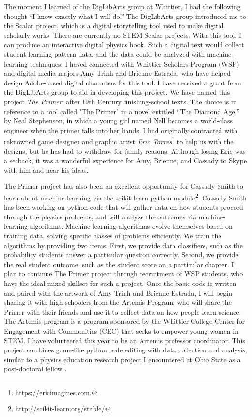 \documentclass[../../main.tex]{subfiles}
\begin{document}
The moment I learned of the DigLibArts group at Whittier, I had the following thought ``I know exactly what I will do.''  The DigLibArts group introduced me to the Scalar project, which is a digital storytelling tool used to make digital scholarly works.  There are currently no STEM Scalar projects.  With this tool, I can produce an interactive digital physics book.  Such a digital text would collect student learning pattern data, and the data could be analyzed with machine-learning techniques.  I haved connected with Whittier Scholars Program (WSP) and digital media majors Amy Trinh and Brienne Estrada, who have helped design Adobe-based digital characters for this tool.  I have received a grant from the DigLibArts group to aid in developing this project.  We have named this project \textit{The Primer}, after 19th Century finishing-school texts.  The choice is in reference to a tool called "The Primer" in a novel entitled ``The Diamond Age,'' by Neal Stephenson, in which a young girl named Nell becomes a world-class engineer when the primer falls into her hands.  I had originally contracted with reknowned game designer and graphic artist \textit{Eric Torres}\footnote{\url{https://ericimagines.com.}} to help us with the designs, but he has had to withdraw for family reasons.  Although losing Eric was a setback, it was a wonderful experience for Amy, Brienne, and Cassady to Skype with him and hear his ideas. \\ \hspace{0.1cm}

The Primer project has also been an excellent opportunity for Cassady Smith to learn about machine learning via the scikit-learn python module\footnote{http://scikit-learn.org/stable/}.  Cassady Smith has been working on python code that will gather data on how students proceed through the physics problems, and will analyze the outcomes via machine-learning algorithms.  Machine-learning algorithms evolve themselves based on training data, solving specific classes of problems efficiently.  We train the algorithms by providing two items.  First, we provide data classifiers, such as the probability students answer a particular question correctly.  Second, we provide the real student outcome, such as the student score on a particular chapter.  I plan to continue The Primer project through recruitment of WSP students, who have the ideal mixed skillset for such a project.  Once the basic code is written and paired with the artwork of Amy Trinh and Brienne Estrada, I will begin sharing it with high-schoolers from the Artemis Program, who will share the Primer with their friends and use it to collect data on how people learn science.  The Artemis program is a program sponsored by the Whittier College Center for Engagement with Communities (CEC) that seeks to empower young women in STEM.  I have volunteered this year to be an Artemis professor coordinator.  This project combines game-like python code editing with data collection and analysis, similar to a physics education research project I encountered at Ohio State as a post-doctoral fellow \cite{orban2017a}.
\end{document}

